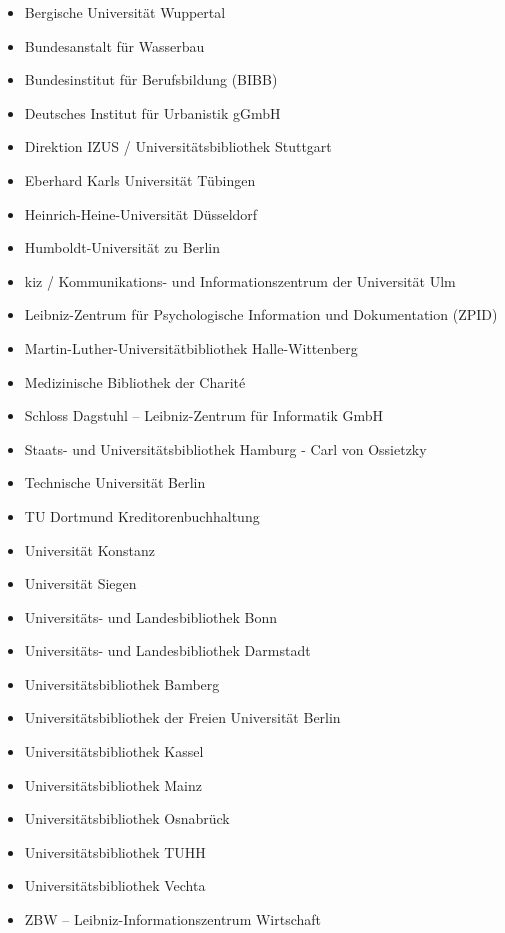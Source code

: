 \documentclass[a4paper,
fontsize=11pt,
oneside,
numbers=noperiodatend,
parskip=half-,
bibliography=totoc,
final
]{scrartcl}
\begin{document}
\begin{itemize}
\item
  Bergische Universität Wuppertal
\item
  Bundesanstalt für Wasserbau
\item
  Bundesinstitut für Berufsbildung (BIBB)
\item
  Deutsches Institut für Urbanistik gGmbH
\item
  Direktion IZUS / Universitätsbibliothek Stuttgart
\item
  Eberhard Karls Universität Tübingen
\item
  Heinrich-Heine-Universität Düsseldorf
\item
  Humboldt-Universität zu Berlin
\item
  kiz / Kommunikations- und Informationszentrum der Universität Ulm
\item
  Leibniz-Zentrum für Psychologische Information und Dokumentation
  (ZPID)
\item
  Martin-Luther-Universitätbibliothek Halle-Wittenberg
\item
  Medizinische Bibliothek der Charité
\item
  Schloss Dagstuhl -- Leibniz-Zentrum für Informatik GmbH
\item
  Staats- und Universitätsbibliothek Hamburg - Carl von Ossietzky
\item
  Technische Universität Berlin
\item
  TU Dortmund Kreditorenbuchhaltung
\item
  Universität Konstanz
\item
  Universität Siegen
\item
  Universitäts- und Landesbibliothek Bonn
\item
  Universitäts- und Landesbibliothek Darmstadt
\item
  Universitätsbibliothek Bamberg
\item
  Universitätsbibliothek der Freien Universität Berlin
\item
  Universitätsbibliothek Kassel
\item
  Universitätsbibliothek Mainz
\item
  Universitätsbibliothek Osnabrück
\item
  Universitätsbibliothek TUHH
\item
  Universitätsbibliothek Vechta
\item
  ZBW -- Leibniz-Informationszentrum Wirtschaft
\end{itemize}
\end{document}
